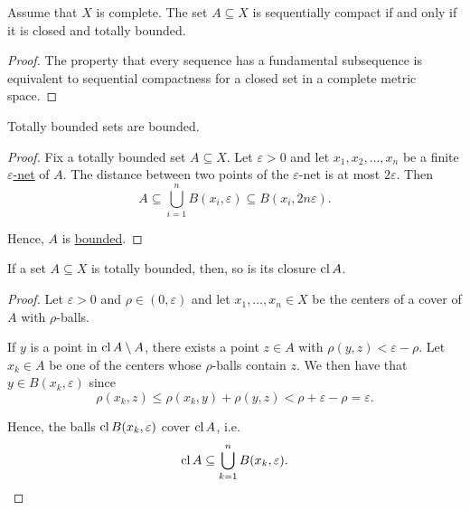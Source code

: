 \begin{corollary}\label{thm:metric_space_compact_iff_closed_totally_bounded}
  Assume that \( X \) is complete. The set \( A \subseteq X \) is sequentially compact if and only if it is closed and totally bounded.
\end{corollary}
\begin{proof}
  The property that every sequence has a fundamental subsequence is equivalent to sequential compactness for a closed set in a complete metric space.
\end{proof}

\begin{proposition}\label{thm:totally_bounded_sets_are_bounded}
  Totally bounded sets are bounded.
\end{proposition}
\begin{proof}
  Fix a totally bounded set \( A \subseteq X \). Let \( \varepsilon > 0 \) and let \( x_1, x_2, \ldots, x_n \) be a finite \hyperref[def:totally_bounded_set/epsilon_net]{\( \varepsilon \)-net} of \( A \). The distance between two points of the \( \varepsilon \)-net is at most \( 2\varepsilon \). Then
  \begin{equation*}
    A \subseteq \bigcup_{i=1}^n B(x_i, \varepsilon) \subseteq B(x_i, 2 n \varepsilon).
  \end{equation*}

  Hence, \( A \) is \hyperref[def:metric_space/bounded_set]{bounded}.
\end{proof}

\begin{proposition}\label{thm:closure_of_totally_bounded_is_totally_bounded}
  If a set \( A \subseteq X \) is totally bounded, then, so is its closure \( \operatorname{cl} A \).
\end{proposition}
\begin{proof}
  Let \( \varepsilon > 0 \) and \( \rho \in (0, \varepsilon) \) and let \( x_1, \ldots, x_n \in X \) be the centers of a cover of \( A \) with \( \rho \)-balls.

  If \( y \) is a point in \( \operatorname{cl} A \setminus A \), there exists a point \( z \in A \) with \( \rho(y, z) < \varepsilon - \rho \). Let \( x_k \in A \) be one of the centers whose \( \rho \)-balls contain \( z \). We then have that \( y \in B(x_k, \varepsilon) \) since
  \begin{equation*}
    \rho(x_k, z) \leq \rho(x_k, y) + \rho(y, z) < \rho + \varepsilon - \rho = \varepsilon.
  \end{equation*}

  Hence, the balls \( \operatorname{cl} B(x_k, \varepsilon) \) cover \( \operatorname{cl} A \), i.e.
  \begin{equation*}
    \operatorname{cl} A \subseteq \bigcup_{k=1}^n B(x_k, \varepsilon).
  \end{equation*}
\end{proof}

